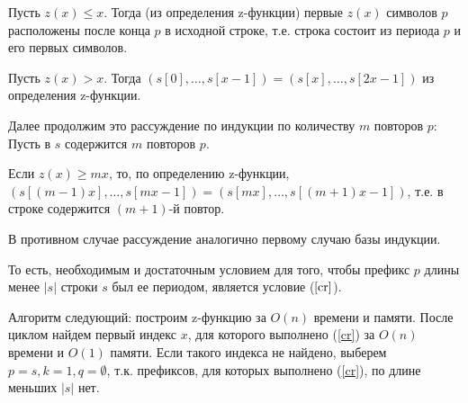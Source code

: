 \documentclass{article}
\begin{document}
Пусть $z(x)\leq x$. Тогда (из определения z-функции) первые $z(x)$ символов $p$ расположены после конца $p$ в исходной строке, т.е. строка состоит из периода $p$ и его первых символов.

Пусть $z(x)>x$. Тогда $(s[0],\dots,s[x-1])=(s[x],\dots,s[2x-1])$ из определения z-функции.

Далее продолжим это рассуждение по индукции по количеству $m$ повторов $p$: Пусть в $s$ содержится $m$ повторов $p$.

Если $z(x)\geq mx$, то, по определению z-функции,\newline $(s[(m-1)x],\dots,s[mx-1])=(s[mx],\dots,s[(m+1)x-1])$, т.е. в строке содержится $(m+1)$-й повтор.

В противном случае рассуждение аналогично первому случаю базы индукции.

То есть, необходимым и достаточным условием для того, чтобы префикс $p$ длины менее $|s|$ строки $s$ был ее периодом, является условие ($\ref{cr}$).

Алгоритм следующий: построим z-функцию за $O(n)$ времени и памяти. После циклом найдем первый индекс $x$, для которого выполнено (\ref{cr}) за $O(n)$ времени и $O(1)$ памяти. Если такого индекса не найдено, выберем $p=s, k=1, q=\emptyset$, т.к. префиксов, для которых выполнено (\ref{cr}), по длине меньших $|s|$ нет.
\end{document}

